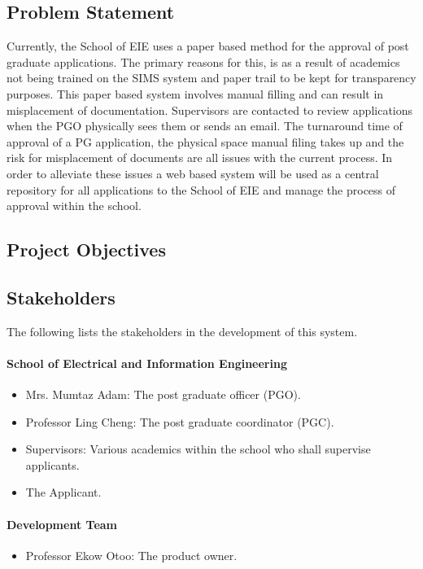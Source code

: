 \documentclass[11pt]{article}
\begin{document}
\subsection{Problem Statement}
Currently, the School of EIE uses a paper based method for the approval of post graduate applications. The primary reasons for this, is as a result of academics not being trained on the SIMS system and paper trail to be kept for transparency purposes. This paper based system involves manual filling and can result in misplacement of documentation. Supervisors are contacted to review applications when the PGO physically sees them or sends an email. The turnaround time of approval of a PG application, the physical space manual filing takes up and the risk for misplacement of documents are all issues with the current process. In order to alleviate these issues a web based system will be used as a central repository for all applications to the School of EIE and manage the process of approval within the school.
\subsection{Project Objectives}
\subsection{Stakeholders}
The following lists the stakeholders in the development of this system.

\paragraph{School of Electrical and Information Engineering}
\begin{itemize}
	
	
	
	\item Mrs. Mumtaz Adam: The post graduate officer (PGO).
	
	\item Professor Ling Cheng: The post graduate coordinator (PGC).
	
	\item Supervisors: Various academics within the school who shall supervise applicants.
	
	\item The Applicant.
	
\end{itemize}

\paragraph{Development Team}
\begin{itemize}
	\item Professor Ekow Otoo: The product owner.
	
\end{itemize}
\end{document}
